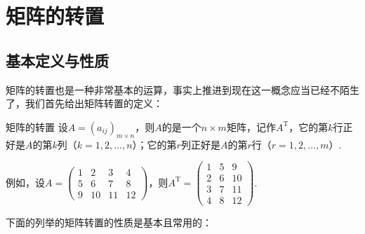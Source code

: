 \section{矩阵的转置}
\subsection{基本定义与性质}

矩阵的转置也是一种非常基本的运算，事实上推进到现在这一概念应当已经不陌生了，我们首先给出矩阵转置的定义：

\begin{definition}{矩阵的转置}{}
    设$A=(a_{ij})_{m \times n}$，则$A$的是一个$n \times m$矩阵，记作$A^\mathrm{T}$，它的第$k$行正好是$A$的第$k$列（$k=1,2,\ldots,n$）；它的第$r$列正好是$A$的第$r$行（$r=1,2,\ldots,m$）.
\end{definition}

例如，设$A=\begin{pmatrix}1 & 2 & 3 & 4 \\ 5 & 6 & 7 & 8 \\ 9 & 10 & 11 & 12\end{pmatrix}$，则$A^\mathrm{T}=\begin{pmatrix}1 & 5 & 9 \\ 2 & 6 & 10 \\ 3 & 7 & 11 \\ 4 & 8 & 12\end{pmatrix}$.

下面的列举的矩阵转置的性质是基本且常用的：

